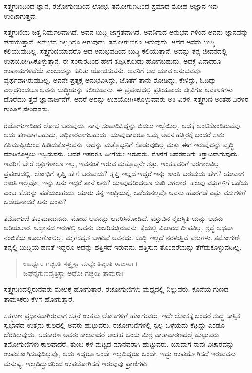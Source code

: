 {\small ಸತ್ತ್ವಗುಣದಿಂದ ಜ್ಞಾನ, ರಜೋಗುಣದಿಂದ ಲೋಭ, ತಮೋಗುಣದಿಂದ ಪ್ರಮಾದ ಮೋಹ ಅಜ್ಞಾನ ಇವು ಉಂಟಾಗುತ್ತವೆ.}

ಸತ್ತ್ವಗುಣಿಯ ಚಿತ್ತ ನಿರ್ಮಲವಾಗಿದೆ. ಅವನ ಬುದ್ಧಿ ಜಾಗ್ರತವಾಗಿದೆ. ಅವನಿಗಾದ ಅನುಭವ ಗಳಿಂದ ಅವನು ಜ್ಞಾನವನ್ನು ಪಡೆಯುತ್ತಾನೆ. ಅನುಭವ ಎಲ್ಲರಿಗೂ ಆಗುವುದು. ತಮೋಗುಣಿಗೂ ಆಗುವುದು. ಆದರೆ ಅವನು ಬುದ್ಧಿ ಕಲಿಯುವುದಿಲ್ಲ. ಸತ್ತ್ವಗುಣಿಯಾದರೊ ಆದ ಅನುಭವದಿಂದ ಬುದ್ಧಿ ಕಲಿಯುತ್ತಾನೆ. ಅದನ್ನು ತನ್ನ ಜೀವನದಲ್ಲಿ ಉಪಯೋಗಿಸಿಕೊಳ್ಳುತ್ತಾನೆ. ಈ ಸಂಸಾರದಿಂದ ಹೇಗೆ ತಪ್ಪಿಸಿಕೊಂಡು ಹೋಗಬಹುದು, ಅದಕ್ಕೆ ಏನಾದರೂ ಉಪಾಯಗಳಿವೆಯೆ ಎಂಬುದನ್ನು ಕುರಿತು ಯೋಚಿಸುವನು. ಅವನಿಗೆ ಆದ ಯಾವ ಅನುಭವವೂ ವ್ಯರ್ಥವಾಗಿರುವುದಿಲ್ಲ. ಅವನೇ ಪ್ರತ್ಯಕ್ಷ ಅನುಭವಿಸಿದ್ದು, ಜೊತೆಗೆ ತಾನು ನೋಡಿದ್ದು, ಕೇಳಿದ್ದು, ಓದಿದ್ದು ಎಲ್ಲದರಿಂದಲೂ ಅವನು ಬುದ್ಧಿಯನ್ನು ಕಲಿಯುವನು. ಈ ಪ್ರಪಂಚದಲ್ಲಿ ಪ್ರತಿಯೊಂದು ಜೀವಿಗೂ ಅವಕಾಶಗಳು ದೊರೆಯು ತ್ತವೆ ಜ್ಞಾನಾರ್ಜನೆಗೆ. ಆದರೆ ಅದನ್ನು ಉಪಯೋಗಿಸಿಕೊಳ್ಳುವವರು ಅತಿ ವಿರಳ. ಸತ್ತ್ವಗುಣಿ ಅಂತಹ ವಿರಳರ ಗುಂಪಿಗೆ ಸೇರಿದವನು.

ರಜೋಗುಣದಿಂದ ಲೋಭ ಬರುವುದು. ನಾವು ಸಂಪಾದಿಸಿದ್ದನ್ನು ಬಿಡಲು ಇಚ್ಛೆಯಿಲ್ಲ. ಅದಕ್ಕೆ ಅಂಟಿಕೊಂಡಿರುವೆವು. ಅದು ಹಣವಾಗಬಹುದು, ಅಧಿಕಾರವಾಗಬಹುದು. ಯಾವುದಾದರೂ ಒಮ್ಮೆ ಅವನ ಹತ್ತಿರಕ್ಕೆ ಬಂದರೆ ಸಾಕು ಕಪಿಮುಷ್ಟಿಯಿಂದ ಹಿಡಿದುಕೊಳ್ಳುವನು. ಅದನ್ನು ಮತ್ತೊಬ್ಬನಿಗೆ ಕೊಡುವುದಿಲ್ಲ ಮತ್ತು ಈಗ ಇರುವುದನ್ನು ವೃದ್ಧಿ ಮಾಡಿಕೊಳ್ಳಲು ಇಚ್ಛಿಸುವನು. ಆದರೆ ಇತರರೂ ಹೀಗೆಯೇ ಇರುವರು. ಕೊನೆಗೆ ಅವರವರಿಗೇ ಕಿತ್ತಾಟವಾಗುವುದು. ಇವರಿಗೆ ಬೇರೆ ಶತ್ರುಗಳಾರೂ ಇಲ್ಲ, ಇವನಂತೆ ಇರುವ ಮತ್ತೊಬ್ಬನೇ ಶತ್ರು. ಇಂತಹವರಿಗೆ ಬರಗಾಲವಿಲ್ಲ ಪ್ರಪಂಚದಲ್ಲಿ. ಲೋಭಿಗೆ ತೃಪ್ತಿ ಹೇಗೆ ಬರುವುದು? ತೃಪ್ತಿ ಇಲ್ಲದೆ ಇದ್ದರೆ ಇನ್ನು ಶಾಂತಿ ಬರುವುದು ಹೇಗೆ? ಯಾವಾಗ ಶಾಂತಿ ಇಲ್ಲವೋ, ಇನ್ನು ಏನು ಇದ್ದರೆ ತಾನೆ ಏನು? ಯಾವುದರಿಂದಲೂ ಸುಖಿ ಆಗಲಾರ. ಹಲವು ವಸ್ತುಗಳಿಗೆ ಒಡೆಯ ಎಂಬ ಹೆಸರನ್ನು ಪಡೆಯಬಹುದು. ಯಾರು ತನ್ನ ಇಂದ್ರಿಯಕ್ಕೆ, ಒಡೆಯನಲ್ಲವೊ ಅವನು ಹೊರಗಡೆ ಎಷ್ಟು ವಸ್ತುಗಳಿಗೆ ಒಡೆಯನಾದರೆ ಏನು ಬಂತು?

ತಮೋಗುಣಿ ತಪ್ಪುಮಾಡುವನು. ಮೋಹ ಅವನನ್ನು ಆವರಿಸಿಕೊಂಡಿದೆ. ವಸ್ತುವಿನ ನೈಜಸ್ಥಿತಿ ಯನ್ನು ಅವನು ಅರಿಯಲಾರ. ಅಜ್ಞಾನದ ಇರುಳಲ್ಲಿ ಅವನು ಸಂಚರಿಸುತ್ತಿರುವನು. ಕೈಯಲ್ಲಿ ವಿಚಾರದ ದೀಪವಿಲ್ಲ. ಶ್ರದ್ಧೆ ಅಥವಾ ನಂಬಿಕೆಯ ಊರುಗೋಲಿಲ್ಲ. ಮೃಗಸದೃಶ ಬಾಳುವೆ ಅವನದು. ಬುದ್ಧಿ ಇಲ್ಲದೆ ನರಳುತ್ತಿವೆ ಪಶುಗಳು. ತಮೋಗುಣಿ ತನ್ನಲ್ಲಿ ಬುದ್ಧಿಯ ಹಣತೆ ಇದ್ದರೂ ಅದನ್ನು ಹತ್ತಿಸದೆ ಇರುವನು. ಹತ್ತಿಸುವ ತೊಂದರೆಯನ್ನು ತೆಗೆದುಕೊಳ್ಳುವುದಿಲ್ಲ.

\begin{verse}
ಊರ್ಧ್ವಂ ಗಚ್ಛಂತಿ ಸತ್ತ್ವಸ್ಥಾ ಮಧ್ಯೇ ತಿಷ್ಠಂತಿ ರಾಜಸಾಃ ।\\ಜಘನ್ಯಗುಣವೃತ್ತಿಸ್ಥಾ ಅಧೋ ಗಚ್ಛಂತಿ ತಾಮಸಾಃ 
\end{verse}

{\small ಸತ್ತ್ವಗುಣದಲ್ಲಿರುವವರು ಮೇಲಕ್ಕೆ ಹೋಗುತ್ತಾರೆ. ರಜೋಗುಣಿಗಳು ಮಧ್ಯದಲ್ಲಿ ನಿಲ್ಲುವರು. ಕೊನೆಯ ಗುಣದ ತಾಮಸಿಕರು ಕೆಳಗೆ ಹೋಗುತ್ತಾರೆ.}

ಸತ್ತ್ವಗುಣ ಪ್ರಧಾನವಾಗಿರುವಾಗ ಸತ್ತರೆ ಉತ್ತಮ ಲೋಕಗಳಿಗೆ ಹೋಗುವರು. ಇದೇ ಲೋಕಕ್ಕೆ ಬಂದರೆ ಶುದ್ಧ ಸಾತ್ವಿಕ ಸ್ವಭಾವದ ಉತ್ತಮ ಕುಲದಲ್ಲಿ ಅವರು ಹುಟ್ಟುವರು. ರಜೋಗುಣಿಗಳಲ್ಲಿ ಸ್ವಲ್ಪ ಒಳ್ಳೆಯದು ಕೆಟ್ಟದ್ದು ಎರಡೂ ಬೆರತಿರುವುದು. ಆದಕಾರಣ ಅವರು ಕಾಲವಾದರೆ ಅಂತಹ ಒಂದು ಮಿಶ್ರ ವಾತಾವಾರಣದಲ್ಲೆ ಹುಟ್ಟುವರು. ತಮೋಗುಣಿಗಳು ಕಾಲವಾದರೆ, ತುಂಬ ಕೆಳ ಮಟ್ಟದ ಮಾನವರಾಗಿ ಹುಟ್ಟುವರು. ಯಾವಾಗ ನಾವು ವಿಚಾರವನ್ನು ಉಪಯೋಗಿಸುವುದಿಲ್ಲವೊ, ಅದು ಇದ್ದರೂ ಒಂದೇ ಇಲ್ಲದಿದ್ದರೂ ಒಂದೇ. ಇದ್ದು ಉಪಯೋಗಿಸದೆ ಇರುವವನು ಮನುಷ್ಯ. ಇಲ್ಲದಿದ್ದುದರಿಂದ ಉಪಯೋಗಿಸದೆ ಇರುವುವು ಪ್ರಾಣಿಗಳು.


